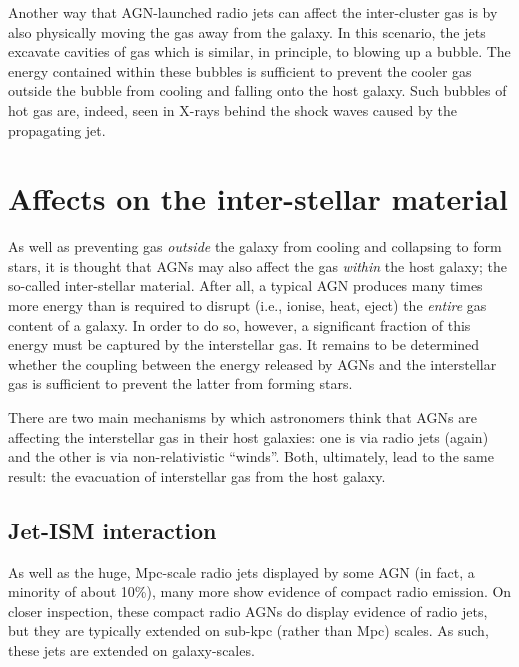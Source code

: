 \documentclass[11pt]{article}
\begin{document}
Another way that AGN-launched radio jets can affect the inter-cluster
gas is by also physically moving the gas away from the galaxy. In this
scenario, the jets excavate cavities of gas which is similar, in principle, to
blowing up a bubble. The energy contained within these bubbles is
sufficient to prevent the cooler gas outside the bubble from cooling
and falling onto the host galaxy. Such bubbles of hot gas are, indeed, seen
in X-rays behind the shock waves caused by the propagating jet.

\section{Affects on the inter-stellar material}
As well as preventing gas {\it outside} the galaxy from cooling and
collapsing to form stars, it is thought that AGNs may also affect the
gas {\it within} the host galaxy; the so-called inter-stellar
material. After all, a typical AGN produces many times more energy
than is required to disrupt (i.e., ionise, heat, eject) the {\it
  entire} gas content of a galaxy. In order to do so, however, a
significant fraction of this energy must be captured by the interstellar
gas. It remains to be determined whether the coupling between the
energy released by AGNs and the interstellar gas is sufficient to
prevent the latter from forming stars. 

There are two main mechanisms by which astronomers think that AGNs are
affecting the interstellar gas in their host galaxies: one is via
radio jets (again) and the other is via non-relativistic
``winds''. Both, ultimately, lead to the same result: the evacuation
of interstellar gas from the host galaxy.

\subsection{Jet-ISM interaction}
As well as the huge, Mpc-scale radio jets displayed by some AGN (in
fact, a minority of about 10\%), many more show evidence of compact
radio emission. On closer inspection, these compact radio AGNs do
display evidence of radio jets, but they are typically extended on
sub-kpc (rather than Mpc) scales. As such, these jets are extended on
galaxy-scales.
\end{document}
